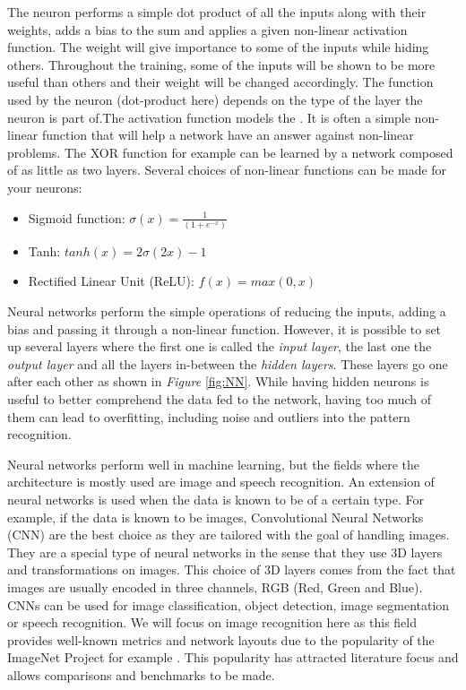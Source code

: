 The neuron performs a simple dot product of all the inputs along with their weights, adds a bias to the sum and applies a given non-linear activation function. The weight will give importance to some of the inputs while hiding others. Throughout the training, some of the inputs will be shown to be more useful than others and their weight will be changed accordingly. The function used by the neuron (dot-product here) depends on the type of the layer the neuron is part of.The activation function models the . It is often a simple non-linear function that will help a network have an answer against non-linear problems. The XOR function for example can be learned by a network composed of as little as two layers. Several choices of non-linear functions can be made for your neurons:
\begin{itemize}
  \item Sigmoid function: $\sigma(x) = \frac{1}{(1+e^{-x})}$
  \item Tanh: $tanh(x) = 2\sigma(2x) - 1$
  \item Rectified Linear Unit (ReLU): $ f(x) = max(0,x) $
\end{itemize}

Neural networks perform the simple operations of reducing the inputs, adding a bias and passing it through a non-linear function. However, it is possible to set up several layers where the first one is called the \emph{input layer}, the last one the \emph{output layer} and all the layers in-between the \emph{hidden layers}. These layers go one after each other as shown in \emph{Figure} \ref{fig:NN}. While having hidden neurons is useful to better comprehend the data fed to the network, having too much of them can lead to overfitting, including noise and outliers into the pattern recognition.

Neural networks perform well in machine learning, but the fields where the architecture is mostly used are image and speech recognition. An extension of neural networks is used when the data is known to be of a certain type. For example, if the data is known to be images, Convolutional Neural Networks (CNN) are the best choice as they are tailored with the goal of handling images. They are a special type of neural networks in the sense that they use 3D layers and transformations on images. This choice of 3D layers comes from the fact that images are usually encoded in three channels, RGB (Red, Green and Blue). CNNs can be used for image classification, object detection, image segmentation or speech recognition. We will focus on image recognition here as this field provides well-known metrics and network layouts due to the popularity of the ImageNet Project for example \cite{ImageNet2009}. This popularity has attracted literature focus and allows comparisons and benchmarks to be made.

